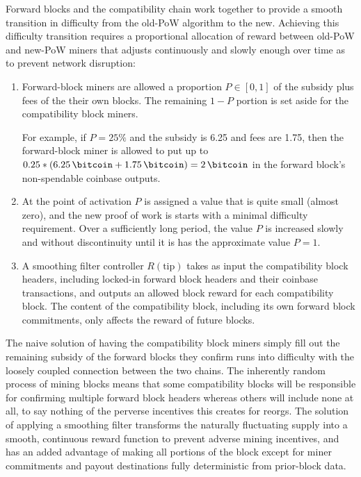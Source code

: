 Forward blocks and the compatibility chain work together to provide a
smooth transition in difficulty from the old-PoW algorithm to the new.
Achieving this difficulty transition requires a proportional
allocation of reward between old-PoW and new-PoW miners that adjusts
continuously and slowly enough over time as to prevent network
disruption:

\begin{enumerate}
  \item
    Forward-block miners are allowed a proportion $P \in [0,1]$ of the
    subsidy plus fees of the their own blocks.  The remaining $1 - P$
    portion is set aside for the compatibility block miners.

    For example, if $P = 25\%$ and the subsidy is \SI{6.25}{\bitcoin}
    and fees are \SI{1.75}{\bitcoin}, then the forward-block miner is
    allowed to put up to $0.25 * (\SI{6.25}{\bitcoin} +
    \SI{1.75}{\bitcoin}) = \SI{2}{\bitcoin}$ in the forward block's
    non-spendable coinbase outputs.

  \item
    At the point of activation $P$ is assigned a value that is quite
    small (almost zero), and the new proof of work is starts with a
    minimal difficulty requirement.  Over a sufficiently long period,
    the value $P$ is increased slowly and without discontinuity until
    it is has the approximate value $P = 1$.

  \item
    A smoothing filter controller $R(\mathrm{tip})$ takes as input the
    compatibility block headers, including locked-in forward block
    headers and their coinbase transactions, and outputs an allowed
    block reward for each compatibility block.  The content of the
    compatibility block, including its own forward block commitments,
    only affects the reward of future blocks.
\end{enumerate}

The naive solution of having the compatibility block miners simply
fill out the remaining subsidy of the forward blocks they confirm runs
into difficulty with the loosely coupled connection between the two
chains.  The inherently random process of mining blocks means that
some compatibility blocks will be responsible for confirming multiple
forward block headers whereas others will include none at all, to say
nothing of the perverse incentives this creates for reorgs.  The
solution of applying a smoothing filter transforms the naturally
fluctuating supply into a smooth, continuous reward function to
prevent adverse mining incentives, and has an added advantage of
making all portions of the block except for miner commitments and
payout destinations fully deterministic from prior-block data.

